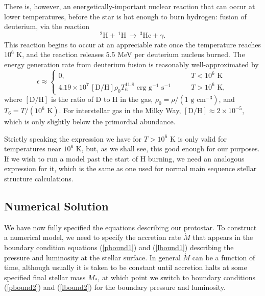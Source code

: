 There is, however, an energetically-important nuclear reaction that can occur at lower temperatures, before the star is hot enough to burn hydrogen: fusion of deuterium, via the reaction
\begin{equation}
^2\mbox{H} + \,^1\mbox{H}\, \rightarrow \, ^3\mbox{He} + \gamma.
\end{equation}
This reaction begins to occur at an appreciable rate once the temperature reaches $10^6$ K, and the reaction releases $5.5$ MeV per deuterium nucleus burned. The energy generation rate from deuterium fusion is reasonably well-approximated by \citep{kippenhahn94a}
\begin{equation}
\epsilon \approx 
\left\{
\begin{array}{ll}
0, & T < 10^6\mbox{ K} \\
4.19\times 10^7\, [\mbox{D}/\mbox{H}] \rho_0 T_6^{11.8} \mbox{ erg g}^{-1}\mbox{ s}^{-1}
\qquad & T > 10^6\mbox{ K},
\end{array}
\right.
\end{equation}
where $[\mbox{D}/\mbox{H}]$ is the ratio of D to H in the gas, $\rho_0=\rho/(1\mbox{ g cm}^{-3})$, and $T_6=T/(10^6\mbox{ K})$. For interstellar gas in the Milky Way, $[\mbox{D}/\mbox{H}]\approx 2\times 10^{-5}$, which is only slightly below the primordial abundance.

Strictly speaking the expression we have for $T>10^6$ K is only valid for temperatures near $10^6$ K, but, as we shall see, this good enough for our purposes. If we wish to run a model past the start of H burning, we need an analogous expression for it, which is the same as one used for normal main sequence stellar structure calculations.

\subsection{Numerical Solution}
\label{ssec:protostar_numeric}

We have now fully specified the equations describing our protostar. To construct a numerical model, we need to specify the accretion rate $\dot{M}$ that appears in the boundary condition equations (\ref{pbound1}) and (\ref{lbound1}) describing the pressure and luminosity at the stellar surface. In general $\dot{M}$ can be a function of time, although usually it is taken to be constant until accretion halts at some specified final stellar mass $M_*$, at which point we switch to boundary conditions (\ref{pbound2}) and (\ref{lbound2}) for the boundary pressure and luminosity.

